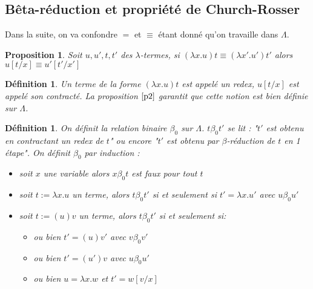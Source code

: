 \documentclass[a4paper,12pt]{article}
\theoremstyle{plain}
\newtheorem{prop}[theo]{Proposition}
\newtheorem{defi}[theo]{Définition}
\begin{document}
\subsection{Bêta-réduction et propriété de Church-Rosser}
\label{beta-reduction et propriete de church-rosser}

Dans la suite, on va confondre $=$ et $\equiv$ étant donné qu'on travaille dans $\Lambda$.

\begin{prop}
\label{p2}
Soit $u, u', t, t'$ des $\lambda$-termes, si $(\lambda x.u)t \equiv (\lambda x'.u')t'$ alors $u[t/x] \equiv u'[t'/x']$
\end{prop}

\begin{defi}
Un terme de la forme $(\lambda x.u)t$ est appelé un redex, $u[t/x]$ est appelé son contracté. La proposition $\ref{p2}$ garantit que cette notion est bien définie sur $\Lambda$.
\end{defi}

\begin{defi}
On définit la relation binaire $\beta_0$ sur $\Lambda$. $t \mathbin{\beta_0} t'$ se lit : "$t'$ est obtenu en contractant un redex de $t$" ou encore "$t'$ est obtenu par $\beta$-réduction de $t$ en 1 étape". On définit $\beta_0$ par induction :

\begin{itemize}
\setlength\itemsep{ -1.5 em}
\item soit $x$ une variable alors $x \mathbin{\beta_0} t$ est faux pour tout $t$\\
\item soit $t := \lambda x.u$ un terme, alors $t \mathbin{\beta_0} t'$ si et seulement si $t' = \lambda x.u'$ avec $u \mathbin{\beta_0} u'$\\
\item soit $t := (u)v$ un terme, alors $t \mathbin{\beta_0} t'$ si et seulement si:
         \begin{itemize}
         \setlength\itemsep{ -1.5 em}
         \item ou bien $t' = (u)v'$ avec $v \mathbin{\beta_0} v'$\\
         \item ou bien $t' = (u')v$ avec $u \mathbin{\beta_0} u'$\\
         \item ou bien $u = \lambda x.w$ et $t' = w[v/x]$
         \end{itemize}
\end{itemize}  
\end{defi}
\end{document}
